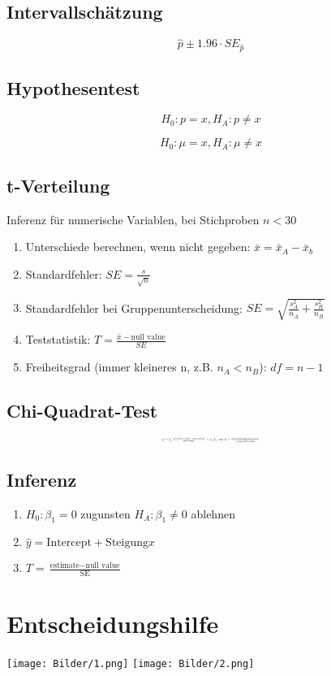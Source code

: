 \documentclass[10pt,a4paper,landscape]{article}
\begin{document}
\begin{multicols}{4}
\subsection{Intervallschätzung}
\[
\hat{p} \pm 1.96 \cdot SE_{\hat{p}}
\]

\subsection{Hypothesentest}
\[
H_0 : p = x, H_A: p \neq x
\]

\[
H_0 : \mu = x, H_A: \mu \neq x
\]

\subsection{t-Verteilung}
Inferenz für numerische Variablen, bei Stichproben $n < 30$

\begin{enumerate}
\item Unterschiede berechnen, wenn nicht gegeben: $\bar{x} = \bar{x}_A - \bar{x}_b$
\item Standardfehler: $SE = \frac{s}{\sqrt{n}}$
\item Standardfehler bei Gruppenunterscheidung: $SE = \sqrt{\frac{s_A^2}{n_A} + \frac{s_B^2}{n_B}}$
\item Teststatistik: $T = \frac{\bar{x} - \text{null value}}{SE}$
\item Freiheitsgrad (immer kleineres n, z.B. $n_A < n_B$): $df = n - 1$
\end{enumerate}

\subsection{Chi-Quadrat-Test}
\[\resizebox{0.25\textwidth}{!}{$
\chi^2 = \sum \frac{(\text{observed count}_i-\text{null count}_i)^2}{\text{null count}_i} = \sum Z_i, ~\text{mit } Z_i = \frac{\text{observed} - \text{expected counts}}{\sqrt{\text{expected counts}}}
$}
\]

\subsection{Inferenz}
\begin{enumerate}
\item $H_0: \beta_1=0$ zugunsten $H_A: \beta_1 \neq 0$ ablehnen
\item $\hat{y}= \text{Intercept} + \text{Steigung}x$
\item $T = \frac{\text{estimate} - \text{null value}}{\text{SE}}$
\end{enumerate}


\section{Entscheidungshilfe}
\texttt{[image: Bilder/1.png]} 
\texttt{[image: Bilder/2.png]} 

\end{multicols}
\end{document}
